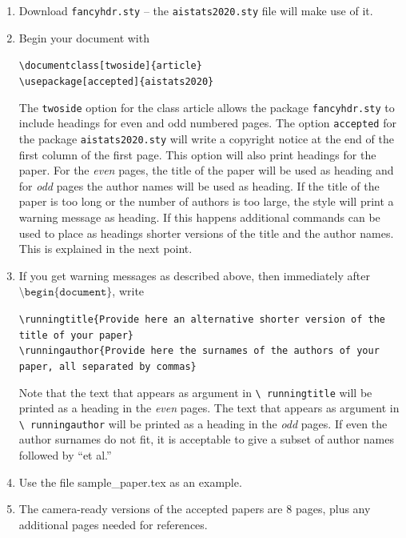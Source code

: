 \documentclass[11pt]{article}
\theoremstyle{plain}
\theoremstyle{definition}
\begin{document}
{\begin{enumerate}
    \item Download \texttt{fancyhdr.sty} -- the
    \texttt{aistats2020.sty} file will make use of it.
    \item Begin your document with
    \begin{flushleft}
    \texttt{\textbackslash documentclass[twoside]\{article\}}\\
    \texttt{\textbackslash usepackage[accepted]\{aistats2020\}}
    \end{flushleft}
    The \texttt{twoside} option for the class article allows the
    package \texttt{fancyhdr.sty} to include headings for even and odd
    numbered pages. The option \texttt{accepted} for the package
    \texttt{aistats2020.sty} will write a copyright notice at the end of
    the first column of the first page. This option will also print
    headings for the paper.  For the \emph{even} pages, the title of
    the paper will be used as heading and for \emph{odd} pages the
    author names will be used as heading.  If the title of the paper
    is too long or the number of authors is too large, the style will
    print a warning message as heading. If this happens additional
    commands can be used to place as headings shorter versions of the
    title and the author names. This is explained in the next point.
    \item  If you get warning messages as described above, then
    immediately after $\texttt{\textbackslash
    begin\{document\}}$, write
    \begin{flushleft}
    \texttt{\textbackslash runningtitle\{Provide here an alternative
    shorter version of the title of your paper\}}\\
    \texttt{\textbackslash runningauthor\{Provide here the surnames of
    the authors of your paper, all separated by commas\}}
    \end{flushleft}
    Note that the text that appears as argument in \texttt{\textbackslash
      runningtitle} will be printed as a heading in the \emph{even}
    pages. The text that appears as argument in \texttt{\textbackslash
      runningauthor} will be printed as a heading in the \emph{odd}
    pages.  If even the author surnames do not fit, it is acceptable
    to give a subset of author names followed by ``et al.''

    \item Use the file sample\_paper.tex as an example.

    \item The camera-ready versions of the accepted papers are 8
      pages, plus any additional pages needed for references.


\end{enumerate}}
\end{document}
